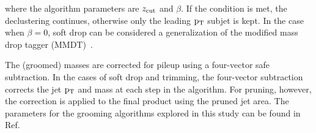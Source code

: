 where the algorithm parameters are $z_{\rm cut}$ and $\beta$.
If the condition is met, the declustering continues, otherwise only the leading $\rm p_{T}$ subjet is kept.
In the case when $\beta=0$, soft drop can be considered a generalization of the modified mass drop tagger (MMDT)~\cite{Dasgupta:2013ihk}. 


The (groomed) masses are corrected for pileup using a four-vector safe subtraction. %
In the cases of soft drop and trimming, the four-vector subtraction corrects the jet $\rm p_{T}$ and mass at each step in the algorithm.
For pruning, however, the correction is applied to the final product using the pruned jet area. 
The parameters for the grooming algorithms explored in this study can be found in Ref.~\cite{JMEPAS} %

                  



